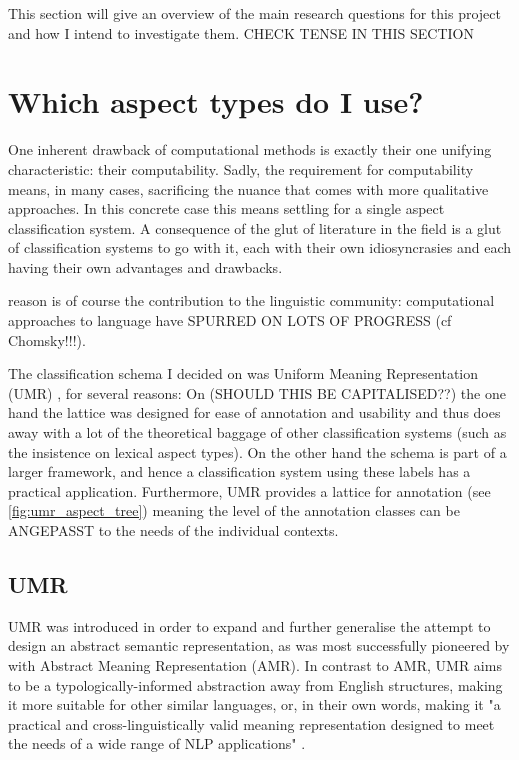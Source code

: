 This section will give an overview of the main research questions for this project and how I intend to investigate them.
CHECK TENSE IN THIS SECTION

\section{Which aspect types do I use?}
One inherent drawback of computational methods is exactly their one unifying characteristic: their computability. Sadly, the requirement for computability means, in many cases, sacrificing the nuance that comes with more qualitative approaches. In this concrete case this means settling for a single aspect classification system. A consequence of the glut of literature in the field is a glut of classification systems to go with it, each with their own idiosyncrasies and each having their own advantages and drawbacks.

reason is of course the contribution to the linguistic community: computational approaches to language have SPURRED ON LOTS OF PROGRESS (cf Chomsky!!!). 

The classification schema I decided on was Uniform Meaning Representation (UMR) \citep{umr}, for several reasons: On (SHOULD THIS BE CAPITALISED??) the one hand the lattice was designed for ease of annotation and usability and thus does away with a lot of the theoretical baggage of other classification systems (such as the insistence on lexical aspect types). On the other hand the schema is part of a larger framework, and hence a classification system using these labels has a practical application. Furthermore, UMR provides a lattice for annotation (see \ref{fig:umr_aspect_tree}) meaning the level of the annotation classes can be ANGEPASST to the needs of the individual contexts.

\subsection{UMR}
UMR \citep{umr} was introduced in order to expand and further generalise the attempt to design an abstract semantic representation, as was most successfully pioneered by \citet{amr} with Abstract Meaning Representation (AMR). In contrast to AMR, UMR aims to be a typologically-informed abstraction away from English structures, making it more suitable for other similar languages, or, in their own words, making it "a practical and cross-linguistically valid meaning representation designed to meet the needs of a wide range of NLP applications" \citep{umr}.

